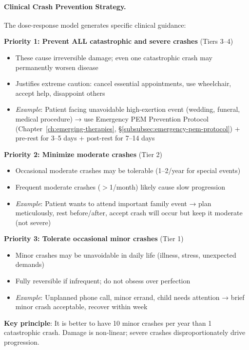\paragraph{Clinical Crash Prevention Strategy.}

The dose-response model generates specific clinical guidance:

\begin{keypoint}
\textbf{Priority 1: Prevent ALL catastrophic and severe crashes} (Tiers 3--4)
\begin{itemize}
    \item These cause irreversible damage; even one catastrophic crash may permanently worsen disease
    \item Justifies extreme caution: cancel essential appointments, use wheelchair, accept help, disappoint others
    \item \textit{Example}: Patient facing unavoidable high-exertion event (wedding, funeral, medical procedure) → use Emergency PEM Prevention Protocol (Chapter~\ref{ch:emerging-therapies}, \S\ref{subsubsec:emergency-pem-protocol}) + pre-rest for 3--5 days + post-rest for 7--14 days
\end{itemize}

\textbf{Priority 2: Minimize moderate crashes} (Tier 2)
\begin{itemize}
    \item Occasional moderate crashes may be tolerable (1--2/year for special events)
    \item Frequent moderate crashes ($>$1/month) likely cause slow progression
    \item \textit{Example}: Patient wants to attend important family event → plan meticulously, rest before/after, accept crash will occur but keep it moderate (not severe)
\end{itemize}

\textbf{Priority 3: Tolerate occasional minor crashes} (Tier 1)
\begin{itemize}
    \item Minor crashes may be unavoidable in daily life (illness, stress, unexpected demands)
    \item Fully reversible if infrequent; do not obsess over perfection
    \item \textit{Example}: Unplanned phone call, minor errand, child needs attention → brief minor crash acceptable, recover within week
\end{itemize}

\textbf{Key principle}: It is better to have 10 minor crashes per year than 1 catastrophic crash. Damage is non-linear; severe crashes disproportionately drive progression.
\end{keypoint}

